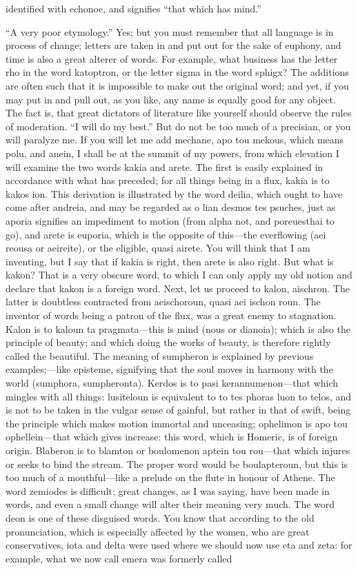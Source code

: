 \documentclass[11pt,letter]{article}
\begin{document}
identified with echonoe, and signifies “that which has mind.”

\par  “A very poor etymology.” Yes; but you must remember that all language is in process of change; letters are taken in and put out for the sake of euphony, and time is also a great alterer of words. For example, what business has the letter rho in the word katoptron, or the letter sigma in the word sphigx? The additions are often such that it is impossible to make out the original word; and yet, if you may put in and pull out, as you like, any name is equally good for any object. The fact is, that great dictators of literature like yourself should observe the rules of moderation. “I will do my best.” But do not be too much of a precisian, or you will paralyze me. If you will let me add mechane, apo tou mekous, which means polu, and anein, I shall be at the summit of my powers, from which elevation I will examine the two words kakia and arete. The first is easily explained in accordance with what has preceded; for all things being in a flux, kakia is to kakos ion. This derivation is illustrated by the word deilia, which ought to have come after andreia, and may be regarded as o lian desmos tes psuches, just as aporia signifies an impediment to motion (from alpha not, and poreuesthai to go), and arete is euporia, which is the opposite of this—the everflowing (aei reousa or aeireite), or the eligible, quasi airete. You will think that I am inventing, but I say that if kakia is right, then arete is also right. But what is kakon? That is a very obscure word, to which I can only apply my old notion and declare that kakon is a foreign word. Next, let us proceed to kalon, aischron. The latter is doubtless contracted from aeischoroun, quasi aei ischon roun. The inventor of words being a patron of the flux, was a great enemy to stagnation. Kalon is to kaloun ta pragmata—this is mind (nous or dianoia); which is also the principle of beauty; and which doing the works of beauty, is therefore rightly called the beautiful. The meaning of sumpheron is explained by previous examples;—like episteme, signifying that the soul moves in harmony with the world (sumphora, sumpheronta). Kerdos is to pasi kerannumenon—that which mingles with all things: lusiteloun is equivalent to to tes phoras luon to telos, and is not to be taken in the vulgar sense of gainful, but rather in that of swift, being the principle which makes motion immortal and unceasing; ophelimon is apo tou ophellein—that which gives increase: this word, which is Homeric, is of foreign origin. Blaberon is to blamton or boulomenon aptein tou rou—that which injures or seeks to bind the stream. The proper word would be boulapteroun, but this is too much of a mouthful—like a prelude on the flute in honour of Athene. The word zemiodes is difficult; great changes, as I was saying, have been made in words, and even a small change will alter their meaning very much. The word deon is one of these disguised words. You know that according to the old pronunciation, which is especially affected by the women, who are great conservatives, iota and delta were used where we should now use eta and zeta: for example, what we now call emera was formerly called 
\end{document}
